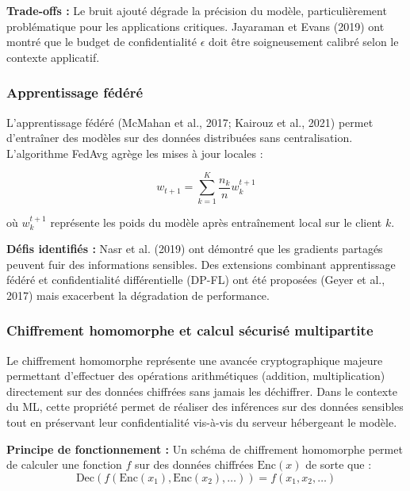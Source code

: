 \textbf{Trade-offs :} Le bruit ajouté dégrade la précision du modèle, particulièrement problématique pour les applications critiques. Jayaraman et Evans (2019) ont montré que le budget de confidentialité $\epsilon$ doit être soigneusement calibré selon le contexte applicatif.

\subsubsection{Apprentissage fédéré}

L'apprentissage fédéré (McMahan et al., 2017; Kairouz et al., 2021) permet d'entraîner des modèles sur des données distribuées sans centralisation. L'algorithme FedAvg agrège les mises à jour locales :

\begin{equation}
w_{t+1} = \sum_{k=1}^{K} \frac{n_k}{n} w_k^{t+1}
\end{equation}

où $w_k^{t+1}$ représente les poids du modèle après entraînement local sur le client $k$.

\textbf{Défis identifiés :} Nasr et al. (2019) ont démontré que les gradients partagés peuvent fuir des informations sensibles. Des extensions combinant apprentissage fédéré et confidentialité différentielle (DP-FL) ont été proposées (Geyer et al., 2017) mais exacerbent la dégradation de performance.

\subsubsection{Chiffrement homomorphe et calcul sécurisé multipartite}

Le chiffrement homomorphe \cite{gentry_fully_2009} représente une avancée cryptographique majeure permettant d'effectuer des opérations arithmétiques (addition, multiplication) directement sur des données chiffrées sans jamais les déchiffrer. Dans le contexte du ML, cette propriété permet de réaliser des inférences sur des données sensibles tout en préservant leur confidentialité vis-à-vis du serveur hébergeant le modèle.

\textbf{Principe de fonctionnement :} Un schéma de chiffrement homomorphe permet de calculer une fonction $f$ sur des données chiffrées $\text{Enc}(x)$ de sorte que :
\begin{equation}
\text{Dec}(f(\text{Enc}(x_1), \text{Enc}(x_2), \ldots)) = f(x_1, x_2, \ldots)
\end{equation}

